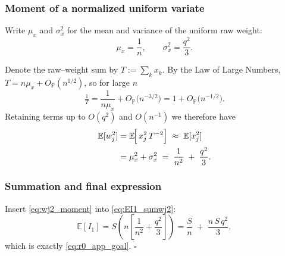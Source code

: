 \subsubsection*{Moment of a normalized uniform variate}

Write $\mu_{x}$ and $\sigma_{x}^{2}$ for the mean and variance of the
uniform raw weight:
\[
  \mu_{x} = \frac{1}{n}, 
  \qquad
  \sigma_{x}^{2} = \frac{q^{2}}{3}.
\]

Denote the raw–weight sum by $T := \sum_{k} x_{k}$.  By the Law of Large Numbers, $T = n\mu_{x}+O_{\mathbb{P}}(n^{1/2})$, so for large $n$
\begin{equation}
  \tfrac1T = \frac{1}{n\mu_{x}}
             + O_{\mathbb{P}}\!\bigl(n^{-3/2}\bigr)
           = 1 + O_{\mathbb{P}}\!\bigl(n^{-1/2}\bigr).
\end{equation}
Retaining terms up to $O(q^{2})$ and $O(n^{-1})$ we therefore have
\begin{align}
  \mathbb{E}[w_{j}^{2}]
    &= \mathbb{E}\!\Bigl[\,x_{j}^{2}\,T^{-2}\Bigr]
      \;\approx\;
      \mathbb{E}[x_{j}^{2}]
      \notag\\
    &= \mu_{x}^{2} + \sigma_{x}^{2}
      \;=\;
      \frac{1}{n^{2}} \;+\; \frac{q^{2}}{3}.
      \label{eq:wj2_moment}
\end{align}

\subsubsection*{Summation and final expression}

Insert \eqref{eq:wj2_moment} into
\eqref{eq:EI1_sumwj2}:
\begin{equation}
  \mathbb{E}[I_{1}]
    = S
      \left(
        n\!\left[\frac{1}{n^{2}} + \frac{q^{2}}{3}\right]
      \right)
    = 
      \frac{S}{n} \;+\; \frac{n\,S\,q^{2}}{3},
\end{equation}
which is exactly \eqref{eq:r0_app_goal}.  \hfill$\square$


